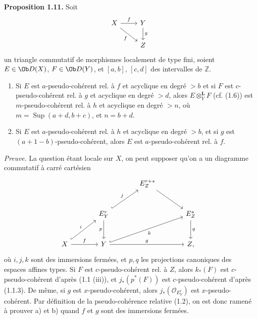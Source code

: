 \textbf{Proposition 1.11.} Soit
\[
\begin{tikzcd}
X \arrow[r,"f"] \arrow[dr,"f"'] & Y \arrow[d,"g"]\\
& Z
\end{tikzcd}
\]
un triangle commutatif de morphismes localement de type fini, soient \(E\in\Ob D(X)\), \(F\in\Ob D(Y)\), et \([a,b]\), \([c,d]\) des intervalles de \(\mathbb Z\).
\begin{enumerate}[label=\alph*)]
\item Si \(E\) est \(a\)-pseudo-cohérent rel. à \(f\) et acyclique en degré \(>b\) et si \(F\) est \(c\)-pseudo-cohérent rel. à \(g\) et acyclique en degré \(>d\), alors \(E\otimes_Y^{\mathbf L}F\) (cf. (1.6)) est \(m\)-pseudo-cohérent rel. à \(h\) et acyclique en degré \(>n\), où \(m=\operatorname{Sup}(a+d,b+c)\), et \(n=b+d\).

\item Si \(E\) est \(a\)-pseudo-cohérent rel. à \(h\) et acyclique en degré \(>b\), et si \(g\) est \((a+1-b)\)-pseudo-cohérent, alors \(E\) est \(a\)-pseudo-cohérent rel. à \(f\).
\end{enumerate}

\emph{Preuve.} La question étant locale sur \(X\), on peut supposer qu'on a un diagramme commutatif à carré cartésien
\[
\begin{tikzcd}[column sep=large,row sep=large]
& & E^{r+s}_Z \arrow[dr] & \\
& E^r_Y \arrow[ur,hook,"j"] \arrow[d,"p"'] & & E^s_Z \arrow[d,"q"]\\
X \arrow[ur,hook,"i"] \arrow[r,"f"] & Y \arrow[urr,hook,"k"'] \arrow[rr,"g"] & & Z{,}
\end{tikzcd}
\]
où \(i,j,k\) sont des immersions fermées, et \(p,q\) les projections canoniques des espaces affines types. Si \(F\) est \(c\)-pseudo-cohérent rel. à \(Z\), alors \(k_*(F)\) est \(c\)-pseudo-cohérent d'après (1.1 (iii)), et \(j_*(p^*(F))\) est \(c\)-pseudo-cohérent d'après (1.1.3). De même, si \(g\) est \(x\)-pseudo-cohérent, alors \(j_*(\mathcal O_{E^r_Y})\) est \(x\)-pseudo-cohérent. Par définition de la pseudo-cohérence relative (1.2), on est donc ramené à prouver a) et b) quand \(f\) et \(g\) sont des immersions fermées.

